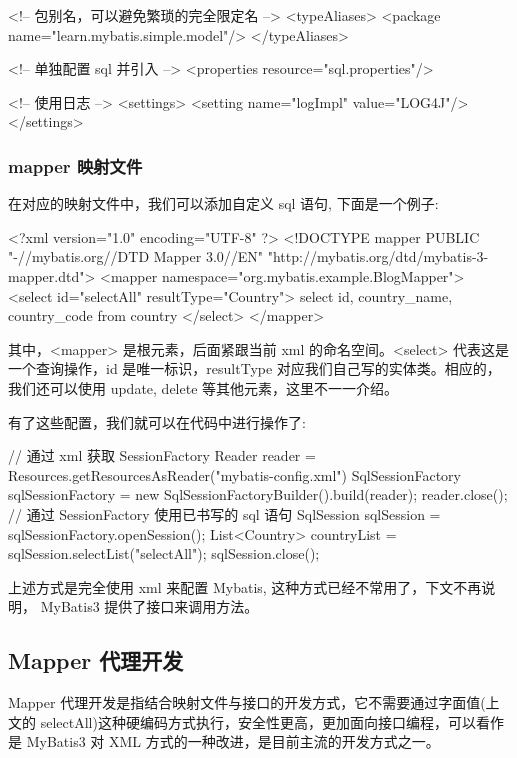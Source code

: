 \begin{xml}
<!-- 包别名，可以避免繁琐的完全限定名 -->
<typeAliases>
    <package name="learn.mybatis.simple.model"/>
</typeAliases>

<!-- 单独配置 sql 并引入 -->
<properties resource="sql.properties"/>

<!-- 使用日志 -->
<settings>
    <setting name="logImpl" value="LOG4J"/>
</settings>
\end{xml}

\subsubsection{mapper 映射文件}

在对应的映射文件中，我们可以添加自定义 sql 语句, 下面是一个例子:

\begin{xml}
<?xml version="1.0" encoding="UTF-8" ?>
<!DOCTYPE mapper PUBLIC "-//mybatis.org//DTD Mapper 3.0//EN"
        "http://mybatis.org/dtd/mybatis-3-mapper.dtd">
<mapper namespace="org.mybatis.example.BlogMapper">
    <select id="selectAll" resultType="Country">
        select id, country_name, country_code from country
    </select>
</mapper>
\end{xml}

其中，<mapper> 是根元素，后面紧跟当前 xml 的命名空间。<select> 代表这是一个查询操作，id 是唯一标识，resultType 对应我们自己写的实体类。相应的，我们还可以使用 update, delete 等其他元素，这里不一一介绍。

有了这些配置，我们就可以在代码中进行操作了:

\begin{Java}
// 通过 xml 获取 SessionFactory
Reader reader = Resources.getResourcesAsReader("mybatis-config.xml")
SqlSessionFactory sqlSessionFactory = new SqlSessionFactoryBuilder().build(reader);
reader.close();
// 通过 SessionFactory 使用已书写的 sql 语句
SqlSession sqlSession = sqlSessionFactory.openSession();
List<Country> countryList = sqlSession.selectList("selectAll");
sqlSession.close();
\end{Java}

上述方式是完全使用 xml 来配置 Mybatis, 这种方式已经不常用了，下文不再说明， MyBatis3 提供了接口来调用方法。

\subsection{Mapper 代理开发}

Mapper 代理开发是指结合映射文件与接口的开发方式，它不需要通过字面值(上文的 selectAll)这种硬编码方式执行，安全性更高，更加面向接口编程，可以看作是 MyBatis3 对 XML 方式的一种改进，是目前主流的开发方式之一。

